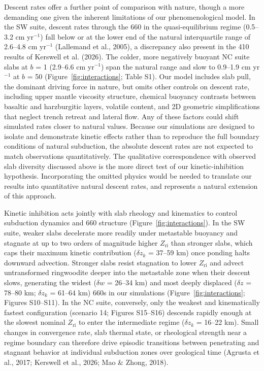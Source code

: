 \documentclass[draft,linenumbers]{agujournal2019}
\begin{document}
Descent rates offer a further point of comparison with nature, though a
more demanding one given the inherent limitations of our
phenomenological model. In the SW suite, descent rates through the 660
in the quasi-equilibrium regime (0.5--3.2 cm yr\(^{-1}\)) fall below or
at the lower end of the natural interquartile range of 2.6--4.8 cm
yr\(^{-1}\) (Lallemand et al., 2005), a discrepancy also present in the
410 results of Kerswell et al. (2026). The colder, more negatively
buoyant NC suite slabs at \(b\) = 1 (2.9--6.6 cm yr\(^{-1}\)) span the
natural range and slow to 0.9--1.9 cm yr\(^{-1}\) at \(b\) = 50
(Figure~\ref{fig:interactions}; Table S1). Our model includes slab pull,
the dominant driving force in nature, but omits other controls on
descent rate, including upper mantle viscosity structure, chemical
buoyancy contrasts between basaltic and harzburgitic layers, volatile
content, and 2D geometric simplifications that neglect trench retreat
and lateral flow. Any of these factors could shift simulated rates
closer to natural values. Because our simulations are designed to
isolate and demonstrate kinetic effects rather than to reproduce the
full boundary conditions of natural subduction, the absolute descent
rates are not expected to match observations quantitatively. The
qualitative correspondence with observed slab diversity discussed above
is the more direct test of our kinetic-inhibition hypothesis.
Incorporating the omitted physics would be needed to translate our
results into quantitative natural descent rates, and represents a
natural extension of this approach.

Kinetic inhibition acts jointly with slab rheology and kinematics to
control subduction dynamics and 660 structure
(Figure~\ref{fig:interactions}). In the SW suite, weaker slabs
decelerate more readily under metastable buoyancy and stagnate at up to
two orders of magnitude higher \(Z_\mathrm{ri}\) than stronger slabs,
which caps their maximum kinetic contribution (\(\delta z_k\) = 37--59
km) once ponding halts downward advection. Stronger slabs resist
stagnation to lower \(Z_\mathrm{ri}\) and advect untransformed
ringwoodite deeper into the metastable zone when their descent slows,
generating the widest (\(\delta w\) = 26--34 km) and most deeply
displaced (\(\delta z\) = 78--80 km; \(\delta z_k\) = 61--64 km) 660s in
our simulations (Figure~\ref{fig:interactions}; Figures S10--S11). In
the NC suite, conversely, only the weakest and kinematically fastest
configuration (scenario 14; Figures S15--S16) descends rapidly enough at
the slowest nominal \(Z_\mathrm{ri}\) to enter the intermediate regime
(\(\delta z_k\) = 16--22 km). Small changes in convergence rate, slab
thermal state, or rheological strength near a regime boundary can
therefore drive episodic transitions between penetrating and stagnant
behavior at individual subduction zones over geological time ({Agrusta
et al.}, 2017; Kerswell et al., 2026; Mao \& Zhong, 2018).
\end{document}
